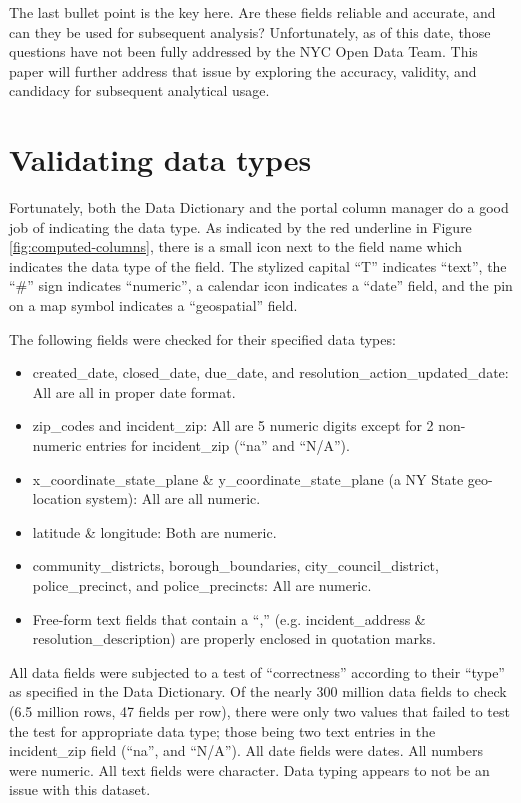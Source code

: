 \documentclass[12pt, titlepage]{article}
\begin{document}
The last bullet point is the key here. Are these fields reliable and accurate, and can they be used for subsequent analysis? Unfortunately,
as of this date, those questions have not been fully addressed by the  NYC Open Data Team. This paper will further address that issue by
exploring the accuracy, validity, and candidacy for subsequent analytical usage.
	
	
	
\section{Validating data types}\label{sec:datatypes}
Fortunately, both the Data Dictionary and the portal column manager do a good job of indicating the data type.
As indicated by the red underline in Figure \ref{fig:computed-columns}, there is a small icon next to the field name 
which indicates the data type of the field. The stylized capital ``T'' indicates ``text'', the ``\#'' sign indicates 
``numeric'', a calendar icon indicates a ``date'' field, and the pin on a map symbol indicates a ``geospatial'' field. 
	
The following fields were checked for their specified data types:
	
\begin{itemize}
	\item created\_date, closed\_date, due\_date, and resolution\_action\_updated\_date: All are all in proper date format.
	\item zip\_codes and incident\_zip: All are 5 numeric digits except for 2 non-numeric entries for incident\_zip (``na'' and ``N/A'').
	\item x\_coordinate\_state\_plane \&  y\_coordinate\_state\_plane (a NY State geo-location system): All are all numeric.
	\item latitude \& longitude: Both are numeric.
	\item community\_districts, borough\_boundaries, city\_council\_district, police\_precinct, and police\_precincts: All are numeric.
	\item Free-form text fields that contain a ``,'' (e.g. incident\_address \& resolution\_description) are properly enclosed in quotation marks.
\end{itemize}	

All data fields were subjected to a test of ``correctness'' according to their ``type'' as specified
in the Data Dictionary. Of the nearly 300 million data fields to check (6.5 million rows, 47 fields per row), there were only two values that failed to test the
test for appropriate data type; those being two text entries in the incident\_zip field (``na'', and ``N/A''). All date fields were dates. All numbers were numeric.
All text fields were character. Data typing appears to not be an issue with this dataset.
\end{document}
